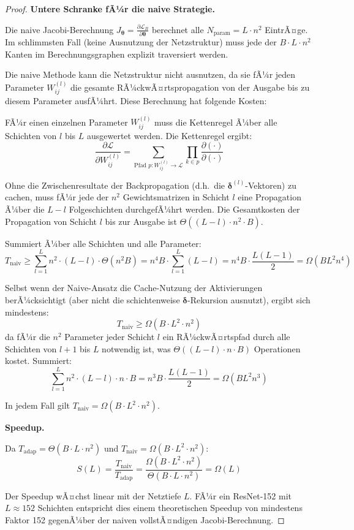 ﻿\documentclass[a4paper,12pt]{article}
\theoremstyle{definition}
\begin{document}
\begin{proof}
	\textbf{Untere Schranke fÃ¼r die naive Strategie.}
	
	Die naive Jacobi-Berechnung $J_{\boldsymbol{\theta}} = \frac{\partial \mathcal{L}_B}{\partial \boldsymbol{\theta}}$ berechnet alle $N_{\mathrm{param}} = L \cdot n^2$ EintrÃ¤ge. Im schlimmsten Fall (keine Ausnutzung der Netzstruktur) muss jede der $B \cdot L \cdot n^2$ Kanten im Berechnungsgraphen explizit traversiert werden.
	
	Die naive Methode kann die Netzstruktur nicht ausnutzen, da sie fÃ¼r jeden Parameter $W^{(l)}_{ij}$ die gesamte RÃ¼ckwÃ¤rtspropagation von der Ausgabe bis zu diesem Parameter ausfÃ¼hrt. Diese Berechnung hat folgende Kosten:
	
	FÃ¼r einen einzelnen Parameter $W^{(l)}_{ij}$ muss die Kettenregel Ã¼ber alle Schichten von $l$ bis $L$ ausgewertet werden. Die Kettenregel ergibt:
	\[
	\frac{\partial \mathcal{L}}{\partial W^{(l)}_{ij}} = \sum_{\text{Pfad } p: W^{(l)}_{ij} \to \mathcal{L}} \prod_{k \in p} \frac{\partial(\cdot)}{\partial(\cdot)}
	\]
	
	Ohne die Zwischenresultate der Backpropagation (d.h.\ die $\boldsymbol{\delta}^{(l)}$-Vektoren) zu cachen, muss fÃ¼r jede der $n^2$ Gewichtsmatrizen in Schicht $l$ eine Propagation Ã¼ber die $L-l$ Folgeschichten durchgefÃ¼hrt werden. Die Gesamtkosten der Propagation von Schicht $l$ bis zur Ausgabe ist $\Theta((L-l) \cdot n^2 \cdot B)$.
	
	Summiert Ã¼ber alle Schichten und alle Parameter:
	\[
	T_{\mathrm{naiv}} \geq \sum_{l=1}^L n^2 \cdot (L - l) \cdot \Theta(n^2 B) = n^4 B \cdot \sum_{l=1}^L (L-l) = n^4 B \cdot \frac{L(L-1)}{2} = \Omega(B L^2 n^4)
	\]
	
	Selbst wenn der Naive-Ansatz die Cache-Nutzung der Aktivierungen berÃ¼cksichtigt (aber nicht die schichtenweise $\boldsymbol{\delta}$-Rekursion ausnutzt), ergibt sich mindestens:
	\[
	T_{\mathrm{naiv}} \geq \Omega(B \cdot L^2 \cdot n^2)
	\]
	da fÃ¼r die $n^2$ Parameter jeder Schicht $l$ ein RÃ¼ckwÃ¤rtspfad durch alle Schichten von $l+1$ bis $L$ notwendig ist, was $\Theta((L-l) \cdot n \cdot B)$ Operationen kostet. Summiert:
	\[
	\sum_{l=1}^{L} n^2 \cdot (L - l) \cdot n \cdot B = n^3 B \cdot \frac{L(L-1)}{2} = \Omega(B L^2 n^3)
	\]
	
	In jedem Fall gilt $T_{\mathrm{naiv}} = \Omega(B \cdot L^2 \cdot n^2)$.
	
	\medskip
	\textbf{Speedup.}
	
	Da $T_{\mathrm{adap}} = \Theta(B \cdot L \cdot n^2)$ und $T_{\mathrm{naiv}} = \Omega(B \cdot L^2 \cdot n^2)$:
	\[
	S(L) = \frac{T_{\mathrm{naiv}}}{T_{\mathrm{adap}}} = \frac{\Omega(B \cdot L^2 \cdot n^2)}{\Theta(B \cdot L \cdot n^2)} = \Omega(L)
	\]
	
	Der Speedup wÃ¤chst linear mit der Netztiefe $L$. FÃ¼r ein ResNet-152 mit $L \approx 152$ Schichten entspricht dies einem theoretischen Speedup von mindestens Faktor 152 gegenÃ¼ber der naiven vollstÃ¤ndigen Jacobi-Berechnung.
\end{proof}
\end{document}
